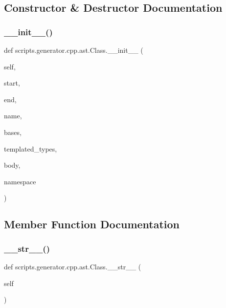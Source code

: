 \subsection{Constructor \& Destructor Documentation}
\mbox{\label{classscripts_1_1generator_1_1cpp_1_1ast_1_1_class_ababc47bedf391a58276af889459ff517}} 
\subsubsection{\texorpdfstring{\_\_init\_\_()}{\_\_init\_\_()}}
{\footnotesize\ttfamily def scripts.\+generator.\+cpp.\+ast.\+Class.\+\_\+\+\_\+init\+\_\+\+\_\+ (\begin{DoxyParamCaption}\item[{}]{self,  }\item[{}]{start,  }\item[{}]{end,  }\item[{}]{name,  }\item[{}]{bases,  }\item[{}]{templated\+\_\+types,  }\item[{}]{body,  }\item[{}]{namespace }\end{DoxyParamCaption})}



\subsection{Member Function Documentation}
\mbox{\label{classscripts_1_1generator_1_1cpp_1_1ast_1_1_class_a40bf2be7fb929cd0604072340b89097d}} 
\subsubsection{\texorpdfstring{\_\_str\_\_()}{\_\_str\_\_()}}
{\footnotesize\ttfamily def scripts.\+generator.\+cpp.\+ast.\+Class.\+\_\+\+\_\+str\+\_\+\+\_\+ (\begin{DoxyParamCaption}\item[{}]{self }\end{DoxyParamCaption})}

